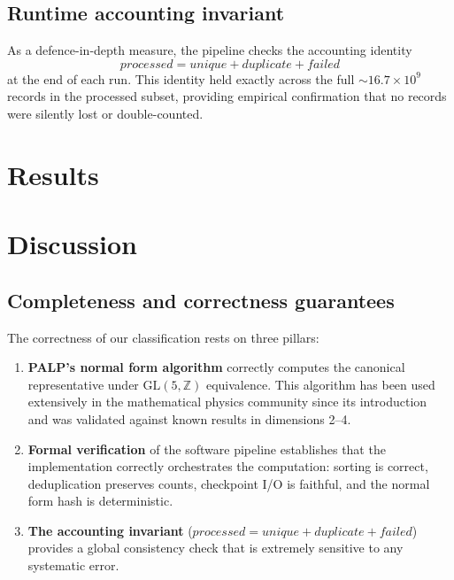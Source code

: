 \documentclass[12pt,a4paper]{article}
\theoremstyle{definition}
\newcommand{\ZZ}{\mathbb{Z}}
\newcommand{\GL}{\mathrm{GL}}
\begin{document}
\subsection{Runtime accounting invariant}

As a defence-in-depth measure, the pipeline checks the accounting
identity
\[
  \mathit{processed} = \mathit{unique} + \mathit{duplicate} + \mathit{failed}
\]
at the end of each run.  This identity held exactly across the full
$\sim 16.7 \times 10^9$ records in the processed subset, providing
empirical confirmation that no records were silently lost or
double-counted.

\section{Results}
\label{sec:results}


\section{Discussion}
\label{sec:discussion}

\subsection{Completeness and correctness guarantees}

The correctness of our classification rests on three pillars:
\begin{enumerate}
  \item \textbf{PALP's normal form algorithm} correctly computes the
        canonical representative under $\GL(5,\ZZ)$ equivalence.  This
        algorithm has been used extensively in the mathematical physics
        community since its introduction~\cite{PALP} and was validated
        against known results in dimensions 2--4.
  \item \textbf{Formal verification} of the software pipeline establishes
        that the implementation correctly orchestrates the computation:
        sorting is correct, deduplication preserves counts, checkpoint
        I/O is faithful, and the normal form hash is deterministic.
  \item \textbf{The accounting invariant} ($\mathit{processed} =
        \mathit{unique} + \mathit{duplicate} + \mathit{failed}$) provides
        a global consistency check that is extremely sensitive to any
        systematic error.
\end{enumerate}
\end{document}
